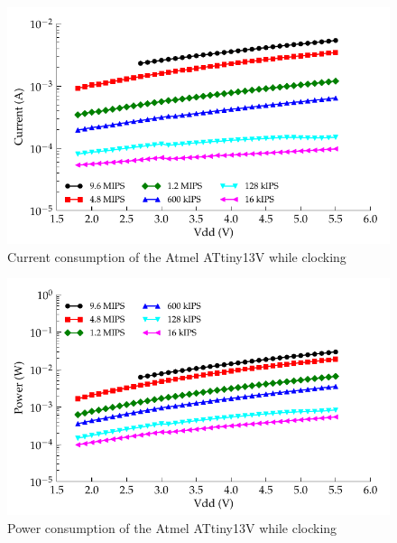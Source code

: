 \begin{figure}
\begin{centering}
\includegraphics{content/appendices/microprocessorPowerMeasurements/graphics/Graph_ATtiny13V_Clock_Current}
\par\end{centering}

\protect\caption{
\label{fig:ATtiny13VClkCurrent}Current consumption of the Atmel ATtiny13V
while clocking
}


\end{figure}
\begin{figure}
\begin{centering}
\includegraphics{content/appendices/microprocessorPowerMeasurements/graphics/Graph_ATtiny13V_Clock_Power}
\par\end{centering}

\protect\caption{
\label{fig:ATtiny13VClkPower}Power consumption of the Atmel ATtiny13V
while clocking
}
\end{figure}
